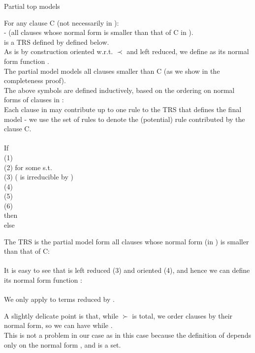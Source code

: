 \begin{definition}{Partial top models \m{\textcolor{blue}{N^t_C,R^t_C,r^t_C,E^t_C,I^t_C}}}
\label{def_4.3.1.2}

\noindent
For any clause C (not necessarily in ):\\ 
 - (all clauses whose normal form is smaller than that of C in ).\\
 is a TRS defined by  defined below.\\
As  is by construction oriented w.r.t. $\prec$ and left reduced, we define  as its normal form function .\\
The partial model  models all clauses smaller than C (as we show in the completeness proof).\\
The above symbols are defined inductively, based on the ordering on normal forms of clauses in :\\
Each clause in  may contribute up to one rule to the TRS that defines the final model - we use the set of rules  to denote the (potential) rule contributed by the clause C.\\
\\
\indent If \\
	\indent \indent (1) \\
	\indent \indent (2)  for some  s.t.\\
	\indent \indent (3)  ( is irreducible by )\\
	\indent \indent (4) \\
	\indent \indent (5) \\
	\indent \indent (6)  \\
\indent	then \\
\indent else \m{\emptyset}

\noindent
The TRS  is the partial model form all clauses whose normal form (in ) is smaller than that of C:\\
\\
It is easy to see that  is left reduced (3) and oriented (4), and hence we can define its normal form function :\\
\\
We only apply  to terms reduced by .

\noindent
A slightly delicate point is that, while $\succ$ is total, we order clauses by their normal form, so we can have 
 while .\\
This is not a problem in our case as  in this case because the definition of  depends only on the normal form , and  is a set.

\noindent


\end{definition}

